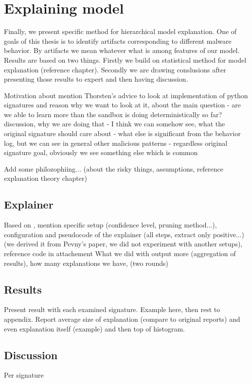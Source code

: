 \chapter{Explaining model} \label{chap:expex}
Finally, we present specific method for hierarchical model explanation. One of goals of this thesis is to identify artifacts corresponding to different malware behavior. By artifacts we mean whatever what is among features of our model. Results are based on two things. Firstly we build on statistical method for model explanation (reference chapter). Secondly we are drawing conslusions after presenting those results to expert and then having discussion.

Motivation about mention Thorsten's advice to look at implementation of python signatures and reason why we want to look at it, about the main question - are we able to learn more than the sandbox is doing deterministically so far?
discussion, why we are doing that - I think we can somehow see, what the original signature should care about - what else is significant from the behavior log, but we can see in general other malicious patterns - regardless original signature goal, obviously we see something else which is common

Add some philozophiing... (about the risky things, assumptions, reference explanation theory chapter)

\section{Explainer}
Based on , mention specific setup (confidence level, pruning method...), configuration and pseudocode of the explainer (all steps, extract only positive...) (we derived it from Pevny's paper, we did not experiment with another setups), reference code in attachement
What we did with output more (aggregation of results), how many explanations we have, (two rounds)
\section{Results}
Present result with each examined signature. Example here, then rest to appendix. Report average size of explanation (compare to original reports) and even explanation itself (example) and then top of histogram.

\section{Discussion}
Per signature

